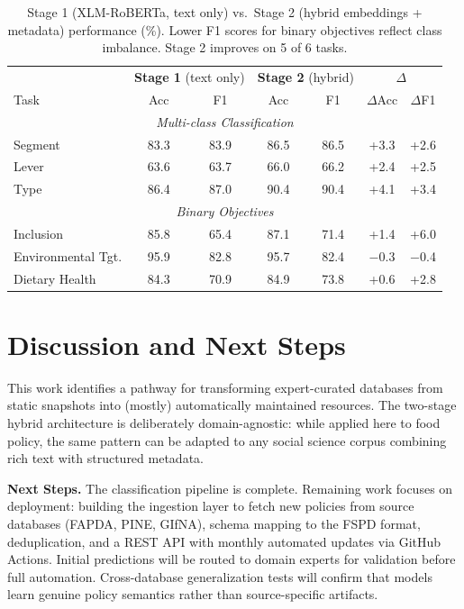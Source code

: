 \documentclass[a4paper,12pt]{article}
\begin{document}
\begin{table}[h]
    \centering
    \small
    \begin{tabular}{l|cc|cc|cc}
        \toprule
         & \multicolumn{2}{c|}{\textbf{Stage 1} (text only)} & \multicolumn{2}{c|}{\textbf{Stage 2} (hybrid)} & \multicolumn{2}{c}{\textbf{$\Delta$}} \\
         Task & Acc & F1 & Acc & F1 & $\Delta$Acc & $\Delta$F1 \\
         \midrule
         \multicolumn{7}{c}{\textit{Multi-class Classification}} \\
         \midrule
         Segment & 83.3 & 83.9 & 86.5 & 86.5 & +3.3 & +2.6 \\
         Lever    & 63.6 & 63.7 & 66.0 & 66.2 & +2.4 & +2.5 \\
         Type     & 86.4 & 87.0 & 90.4 & 90.4 & +4.1 & +3.4 \\
         \midrule
         \multicolumn{7}{c}{\textit{Binary Objectives}} \\
         \midrule
         Inclusion          & 85.8 & 65.4 & 87.1 & 71.4 & +1.4 & +6.0 \\
         Environmental Tgt. & 95.9 & 82.8 & 95.7 & 82.4 & $-$0.3 & $-$0.4 \\
         Dietary Health     & 84.3 & 70.9 & 84.9 & 73.8 & +0.6 & +2.8 \\
         \bottomrule
    \end{tabular}
    \caption{Stage 1 (XLM-RoBERTa, text only) vs.\ Stage 2 (hybrid embeddings + metadata) performance (\%). Lower F1 scores for binary objectives reflect class imbalance. Stage 2 improves on 5 of 6 tasks.}
    \label{tab:results}
\end{table}

\section*{Discussion and Next Steps}

This work identifies a pathway for transforming expert-curated databases from static snapshots into (mostly) automatically maintained resources. The two-stage hybrid architecture is deliberately domain-agnostic: while applied here to food policy, the same pattern can be adapted to any social science corpus combining rich text with structured metadata. \newline

\noindent\textbf{Next Steps.} The classification pipeline is complete. Remaining work focuses on deployment: building the ingestion layer to fetch new policies from source databases (FAPDA, PINE, GIfNA), schema mapping to the FSPD format, deduplication, and a REST API with monthly automated updates via GitHub Actions. Initial predictions will be routed to domain experts for validation before full automation. Cross-database generalization tests will confirm that models learn genuine policy semantics rather than source-specific artifacts.
\end{document}
